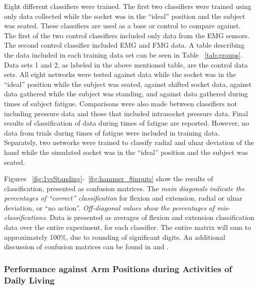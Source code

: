 \documentclass[twocolumn]{sagej}
\begin{document}
Eight different classifiers were trained.  The first two classifiers were trained using only data collected while the socket was in the ``ideal'' position and the subject was seated. These classifiers are used as a base or control to compare against. The first of the two control classifiers included only data from the EMG sensors.  The second control classifier included EMG and FMG data.  A table describing the data included in each training data set can be seen in Table ~\ref{tab:groups}.  Data sets 1 and 2, as labeled in the above mentioned table, are the control data sets.  All eight networks were tested against data while the socket was in the ``ideal'' position while the subject was seated, against shifted socket data, against data gathered while the subject was  standing, and against data gathered during times of subject fatigue.  Comparisons were also made between classifiers not including pressure data and those that included intrasocket pressure data.  Final results of classification of data during times of fatigue are reported.  However, no data from trials during times of fatigue were included in training data.  Separately, two networks were trained to classify radial and ulnar deviation of the hand while the simulated socket was in the ``ideal'' position and the subject was seated. \par \noindent %
Figures ~\ref{fig:1vsStanding}-~\ref{fig:hammer_8inputs} show the results of classification, presented as confusion matrices. The \textit{main diagonals indicate the percentages of ``correct'' classification} for flexion and extension, radial or ulnar deviation, or ``no action''.   \textit{Off-diagonal values show the percentages of mis-classifications}. Data is presented as averages of flexion and extension classification data over the entire experiment, for each classifier.  The entire matrix will sum to approximately 100$\%$, due to rounding of significant digits.  An additional discussion of confusion matrices can be found in \cite{Moller1993} and \cite{CourseraNg2016}.

\subsubsection*{Performance against Arm Positions during Activities of Daily Living}
\label{sec:res_arm}

\begin{comment}
Data comparing different training data sets to Standing

ideal, standing, shift -> standing
ideal, shift -> standing
ideal, standing -> standing
ideal -> standing
\end{comment}
\end{document}
